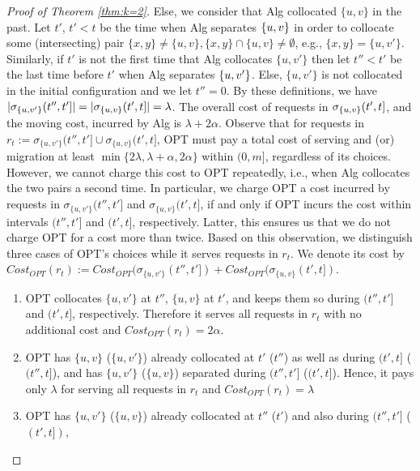 \documentclass[manuscript,screen=true, review, anonymous]{acmart}
\DeclarePairedDelimiter\set{\{}{\}}
\begin{document}
\begin{proof}[Proof of Theorem \ref{thm:k=2}]
	Else, we consider that Alg collocated $\{u,v\}$ in the past.
	Let $t'$, $t' < t$ be the  time when Alg separates $\set{u,v}$
	in order to collocate some (intersecting) pair
	$\{x,y\} \neq \{u,v\}, \{x,y\} \cap \{u,v\} \neq \emptyset$, 
	e.g.,
	$\{x,y\}=\{u,v'\}$.
	Similarly,
	if $t'$ is not the first time that Alg  collocates $\{u,v'\}$ 
	then let $t''<t'$ be the last time before $t'$ when Alg separates $\set{u,v'}$.
	Else,
	$\{u,v'\}$ is not collocated in the initial configuration and we let $t''=0$.
	By these definitions,
	we have
	$| \sigma_{\set{u,v'}}(t'',t'] | = | \sigma_{\set{u,v}}(t',t] |  =  \lambda$.
	The overall cost of requests in $\sigma_{\set{u,v}}(t',t]$,
	and the moving cost,
	incurred by Alg is
	$\lambda + 2\alpha$.
	Observe that for requests in $r_t := \sigma_{\{u,v'\}}(t'',t'] \cup \sigma_{\{u,v\}}(t',t]$,
	OPT must pay a total cost of serving and (or) migration at least
	$\min{ \{ 2\lambda, \lambda+\alpha, 2\alpha \} }$
	within $(0,m]$,
	regardless of its choices.
	However,
	we cannot charge this cost to OPT repeatedly,
	i.e.,
	when Alg collocates the two pairs a second time.
	In particular,
	we charge OPT a cost incurred by requests in
	$\sigma_{\{u,v'\}}(t'',t']$ and $\sigma_{\{u,v\}}(t',t]$,
	if and only if  OPT incurs the cost within  intervals $(t'', t']$ and $(t', t]$,
	respectively.	
	Latter,
	this ensures us that we do not charge OPT for a cost more than twice.
	Based on this observation,
	we distinguish three cases of OPT's choices
	while it serves requests in	$r_t $.
	We denote its cost by
	$\mathit{Cost}_{\mathit{OPT}} (r_t) := \mathit{Cost}_{\mathit{OPT}} (\sigma_{\{u,v'\}}(t'',t']) 
	+ \mathit{Cost}_{\mathit{OPT}} (\sigma_{\{u,v\}}(t',t]) $.
	\begin{enumerate}[label=\roman*.]
		\item
		OPT collocates $\{u,v'\}$ at  $t''$, $\{u,v\}$  at $t'$,
		and keeps them so during $(t'',t']$ and $(t',t]$, respectively.
		Therefore it serves all requests in $r_t$ with no additional cost and
		$\mathit{Cost}_{\mathit{OPT}} (r_t) = 2\alpha$.
		\item
		OPT has $\{u,v\}$ ($\{u,v'\}$) already collocated at $t'$ ($t''$) as well as during $(t',t]$ ($(t'',t]$),
		and has $\{u,v'\}$ ($\{u,v\}$) separated during $(t'',t']$ ($(t',t]$).
		Hence,
		it pays only $\lambda$ for serving all requests in $r_t$ and
		$\mathit{Cost}_{\mathit{OPT}} (r_t) = \lambda$
		\item
		OPT has $\{u,v'\}$ ($\{u,v\}$) already  collocated at $t''$ ($t'$)  and also during $(t'',t']$ ($(t', t])$,

\end{enumerate}
\end{proof}
\end{document}
